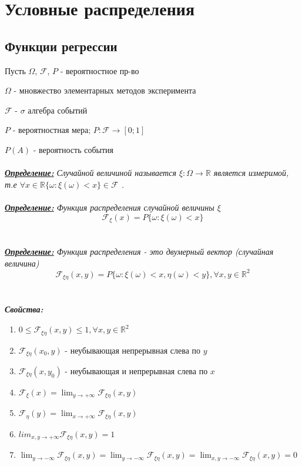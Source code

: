 \documentclass[a4paper,12pt]{article}
\begin{document}
\section{Условные распределения}\label{yslov_rasp}
\subsection{Функции регрессии}\label{func_regress}
Пусть $\Omega$, $\mathcal{F}$, $P$ - вероятностное пр-во 

$\Omega$ - мновжество элементарных методов эксперимента

$\mathcal{F}$ - $\sigma $ алгебра событий

$P$ - вероятностная мера; $P : \mathcal{F} \rightarrow [ 0 ; 1] $

$P(A)$ - вероятность события
\\
\\
\textbf{\textit{\underline{Определение:}}} \textit{Случайной величиной называется $\xi : \Omega \rightarrow \mathbb{R}$ является измеримой, т.е $\forall x \in \mathbb{R} \{\omega : \xi(\omega) < x\} \in \mathcal{F}$ .}\\
\\
\textit{\textbf{\underline{Определение:}} Функция распределения случайной величины $\xi$} \[\mathcal{F}_{\xi}(x)=P\{\omega:\xi(\omega)<x\}\]
\\
\\
\textit{\textbf{\underline{Определение:}} Функция распределения - это двумерный вектор (случайная величина)} \[\mathcal{F}_{\xi \eta }(x,y) = P\{\omega: \xi(\omega)<x, \eta(\omega)<y\} ,  \forall x,y \in \mathbb{R}^{2}\]
\\
\\
\textit{\textbf{Свойства:}}
\begin{enumerate}
    \item $0 \leq \mathcal{F}_{\xi \eta}(x,y) \leq 1, \forall x,y \in \mathbb{R}^{2}$
    \item $\mathcal{F}_{\xi \eta}(x_{0},y)$ - неубывающая непрерывная слева по $y$
    \item $\mathcal{F}_{\xi \eta}(x, y_{0})$ - неубывающая и непрерывная слева по $x$
    \item $\mathcal{F}_{\xi} (x) = \lim_{y \to +\infty} \mathcal{F}_{\xi \eta}(x, y)$
    \item $\mathcal{F}_{\eta} (y) = \lim_{x \to +\infty} \mathcal{F}_{\xi \eta}(x, y)$
    \item $lim_{x,y \to +\infty} \mathcal{F}_{\xi \eta}(x, y) = 1$
    \item $\lim_{y \to -\infty}\mathcal{F}_{\xi \eta}(x, y) =\lim_{y \to -\infty}\mathcal{F}_{\xi \eta}(x, y) = \lim_{x,y \to -\infty}\mathcal{F}_{\xi \eta}(x,y) = 0$
\end{enumerate}
\end{document}

